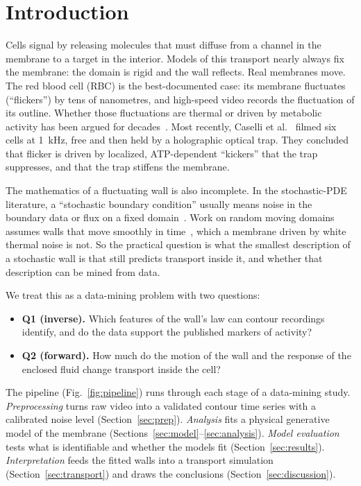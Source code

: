 \documentclass[conference]{IEEEtran}
\begin{document}
\section{Introduction}

Cells signal by releasing molecules that must diffuse from a channel in the membrane to a target in
the interior. Models of this transport nearly always fix the membrane: the domain is rigid and the
wall reflects. Real membranes move. The red blood cell (RBC) is the best-documented case: its
membrane fluctuates (``flickers'') by tens of nanometres, and high-speed video records the
fluctuation of its outline. Whether those fluctuations are thermal or driven by metabolic activity
has been argued for decades~\cite{turlier2016}. Most recently, Caselli et al.~\cite{caselli2024}
filmed six cells at 1~kHz, free and then held by a holographic optical trap. They concluded that
flicker is driven by localized, ATP-dependent ``kickers'' that the trap suppresses, and that the
trap stiffens the membrane.

The mathematics of a fluctuating wall is also incomplete. In the stochastic-PDE literature, a
``stochastic boundary condition'' usually means noise in the boundary data or flux on a fixed
domain~\cite{prusty2012,schnaubelt2011,brzezniak2010,zhou2022,maurelli2025}. Work on random moving
domains assumes walls that move smoothly in time~\cite{djurdjevac2019,burdzy2004}, which a membrane
driven by white thermal noise is not. So the practical question is what the smallest description of
a stochastic wall is that still predicts transport inside it, and whether that description can be
mined from data.

We treat this as a data-mining problem with two questions:
\begin{itemize}
\item \textbf{Q1 (inverse).} Which features of the wall's law can contour recordings identify, and
do the data support the published markers of activity?
\item \textbf{Q2 (forward).} How much do the motion of the wall and the response of the enclosed
fluid change transport inside the cell?
\end{itemize}
The pipeline (Fig.~\ref{fig:pipeline}) runs through each stage of a data-mining study.
\emph{Preprocessing} turns raw video into a validated contour time series with a calibrated noise
level (Section~\ref{sec:prep}). \emph{Analysis} fits a physical generative model of the membrane
(Sections~\ref{sec:model}--\ref{sec:analysis}). \emph{Model evaluation} tests what is identifiable
and whether the models fit (Section~\ref{sec:results}). \emph{Interpretation} feeds the fitted walls
into a transport simulation (Section~\ref{sec:transport}) and draws the conclusions
(Section~\ref{sec:discussion}).
\end{document}

